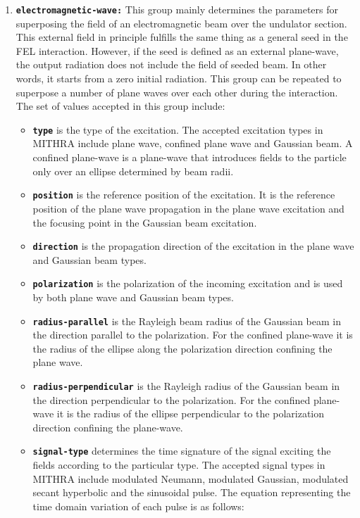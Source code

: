 \begin{enumerate}
\item \textbf{\texttt{electromagnetic-wave:}} This group mainly determines the parameters for superposing the field of an electromagnetic beam over the undulator section. This external field in principle fulfills the same thing as a general seed in the FEL interaction. However, if the seed is defined as an external plane-wave, the output radiation does not include the field of seeded beam. In other words, it starts from a zero initial radiation. This group can be repeated to superpose a number of plane waves over each other during the interaction. The set of values accepted in this group include:
\begin{itemize}
    \item \textbf{\texttt{type}} is the type of the excitation. The accepted excitation types in MITHRA include plane wave, confined plane wave and Gaussian beam. A confined plane-wave is a plane-wave that introduces fields to the particle only over an ellipse determined by beam radii.
    \item \textbf{\texttt{position}} is the reference position of the excitation. It is the reference position of the plane wave propagation in the plane wave excitation and the focusing point in the Gaussian beam excitation.
	\item \textbf{\texttt{direction}} is the propagation direction of the excitation in the plane wave and Gaussian beam types.
	\item \textbf{\texttt{polarization}} is the polarization of the incoming excitation and is used by both plane wave and Gaussian beam types.
	\item \textbf{\texttt{radius-parallel}} is the Rayleigh beam radius of the Gaussian beam in the direction parallel to the polarization. For the confined plane-wave it is the radius of the ellipse along the polarization direction confining the plane wave.
	\item \textbf{\texttt{radius-perpendicular}} is the Rayleigh radius of the Gaussian beam in the direction perpendicular to the polarization. For the confined plane-wave it is the radius of the ellipse perpendicular to the polarization direction confining the plane-wave.
	\item \textbf{\texttt{signal-type}} determines the time signature of the signal exciting the fields according to the particular type. The accepted signal types in MITHRA include modulated Neumann, modulated Gaussian, modulated secant hyperbolic and the sinusoidal pulse. The equation representing the time domain variation of each pulse is as follows:

\end{itemize}
\end{enumerate}

